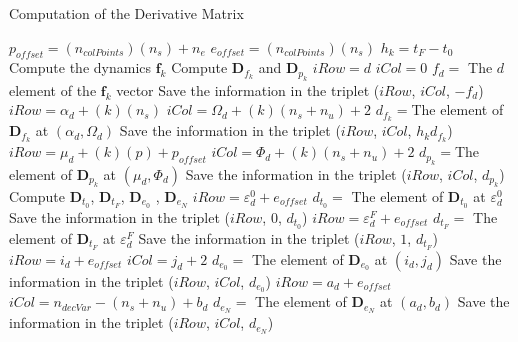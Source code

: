 \documentclass[12pt]{article}
\begin{document}
\begin{algorithm}
	\caption{Computation of the Derivative Matrix} 
	\begin{algorithmic}[1]
	    \State $p_{offset}=(n_{colPoints})(n_s)+n_e$
	    \State $e_{offset}=(n_{colPoints})(n_s)$
	    \State $h_k=t_F-t_0$
		    \State Compute the dynamics $\bm{f}_k$
		    \State Compute $\bm{D}_{f_k}$ and $\bm{D}_{p_k}$
			    \State $iRow=d$
			    \State $iCol=0$
			    \State $f_d= $ The $d$ element of the $\bm{f}_k$ vector
				\State Save the information in the triplet ($iRow$, $iCol$, $-f_d$)
			\EndFor
			    \State $iRow=\alpha_d+(k)(n_s)$
			    \State $iCol=\Omega_d+(k)(n_s+n_u)+2$
			    \State $d_{f_k}=$The element of $ \bm{D}_{f_k} $ at $ (\alpha_d,\Omega_d)$
				\State Save the information in the triplet ($iRow$, $iCol$, $h_kd_{f_k}$)
			\EndFor
			    \State $iRow=\mu_d+(k)(p)+p_{offset}$
			    \State $iCol=\Phi_d+(k)(n_s+n_u)+2$
			    \State $d_{p_k}=$The element of $ \bm{D}_{p_k} $ at $ (\mu_d,\Phi_d)$
				\State Save the information in the triplet ($iRow$, $iCol$, $d_{p_k}$)
			\EndFor
		\EndFor
		\State Compute $\bm{D}_{t_0}$, $\bm{D}_{t_F}$, $\bm{D}_{e_0}$ , $\bm{D}_{e_N}$
		        \State $iRow=\varepsilon^0_d+ e_{offset}$
                \State $d_{t_0}=$ The element of $\bm{D}_{t_0}$ at $\varepsilon^0_d$
				\State Save the information in the triplet ($iRow$, $0$, $d_{t_0}$)
		\EndFor
		        \State $iRow=\varepsilon^F_d+ e_{offset}$
                \State $d_{t_F}=$ The element of $\bm{D}_{t_F}$ at $\varepsilon^F_d$
				\State Save the information in the triplet ($iRow$, $1$, $d_{t_F}$)
		\EndFor
		        \State $iRow=i_d+ e_{offset}$
			    \State $iCol=j_d+2$
			    \State $d_{e_0}=$ The element of $\bm{D}_{e_0}$ at $(i_d,j_d)$
				\State Save the information in the triplet ($iRow$, $iCol$, $d_{e_0}$)
		\EndFor
		        \State $iRow=a_d+ e_{offset}$
			    \State $iCol=n_{decVar}-(n_s+n_u)+b_d$
			    \State $d_{e_N}=$ The element of $\bm{D}_{e_N}$ at $(a_d,b_d)$
				\State Save the information in the triplet ($iRow$, $iCol$, $d_{e_N}$)
		\EndFor		
		
	\end{algorithmic} 
\end{algorithm}
\end{document}
